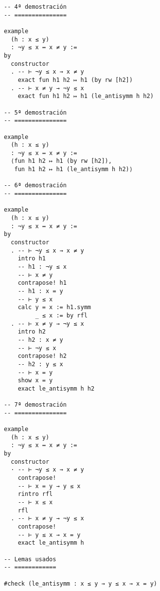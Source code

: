 \begin{verbatim}
-- 4ª demostración
-- ===============

example
  (h : x ≤ y)
  : ¬y ≤ x ↔ x ≠ y :=
by
  constructor
  . -- ⊢ ¬y ≤ x → x ≠ y
    exact fun h1 h2 ↦ h1 (by rw [h2])
  . -- ⊢ x ≠ y → ¬y ≤ x
    exact fun h1 h2 ↦ h1 (le_antisymm h h2)

-- 5ª demostración
-- ===============

example
  (h : x ≤ y)
  : ¬y ≤ x ↔ x ≠ y :=
  ⟨fun h1 h2 ↦ h1 (by rw [h2]),
   fun h1 h2 ↦ h1 (le_antisymm h h2)⟩

-- 6ª demostración
-- ===============

example
  (h : x ≤ y)
  : ¬y ≤ x ↔ x ≠ y :=
by
  constructor
  . -- ⊢ ¬y ≤ x → x ≠ y
    intro h1
    -- h1 : ¬y ≤ x
    -- ⊢ x ≠ y
    contrapose! h1
    -- h1 : x = y
    -- ⊢ y ≤ x
    calc y = x := h1.symm
         _ ≤ x := by rfl
  . -- ⊢ x ≠ y → ¬y ≤ x
    intro h2
    -- h2 : x ≠ y
    -- ⊢ ¬y ≤ x
    contrapose! h2
    -- h2 : y ≤ x
    -- ⊢ x = y
    show x = y
    exact le_antisymm h h2

-- 7ª demostración
-- ===============

example
  (h : x ≤ y)
  : ¬y ≤ x ↔ x ≠ y :=
by
  constructor
  · -- ⊢ ¬y ≤ x → x ≠ y
    contrapose!
    -- ⊢ x = y → y ≤ x
    rintro rfl
    -- ⊢ x ≤ x
    rfl
  . -- ⊢ x ≠ y → ¬y ≤ x
    contrapose!
    -- ⊢ y ≤ x → x = y
    exact le_antisymm h

-- Lemas usados
-- ============

#check (le_antisymm : x ≤ y → y ≤ x → x = y)
\end{verbatim}

